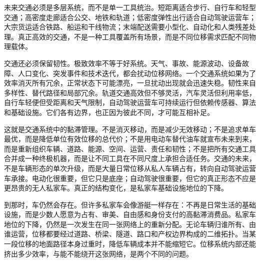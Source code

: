 
未来交通必须是多层系统，而不是单一工具统治。短距离适合步行、自行车和轻型交通；高密度走廊适合公交、地铁和轨道；低密度弹性出行适合自动驾驶运营车；大宗货运适合铁路、船运和干线物流；末端配送需要小型化、自动化和人类残差处理。真正高效的交通，不是一种工具覆盖所有场景，而是不同位移需求匹配不同物理载体。

交通还必须保留韧性。极致效率不等于好系统。天气、事故、能源波动、设备故障、人口变化、突发事件和技术迭代，都会扰动位移网络。一个交通系统如果为了效率消灭所有冗余，正常状态下可能漂亮，一旦扰动出现就会迅速失稳。韧性来自多样性、替代路径和局部冗余。轨道交通高效但不够灵活，汽车灵活但利用率低，自行车轻便但受距离和天气限制，自动驾驶运营车可持续运行但依赖传感器、算法和基础设施。它们各有边界，也正因为彼此不同，才可能互相补足。

这就是交通系统中的黏滞管理。不是消灭移动，而是减少无效移动；不是追求单车最优，而是降低单位有效位移的总代价；不是用电动车替代油车就宣布未来到来，而是重新组织车辆、道路、能源、空间、运营、责任和韧性；不是把所有交通工具合并成一种终极机器，而是让不同工具在不同尺度上承担合适任务。交通的未来，不是车辆形态的单次升级，而是大量日常位移从私人车辆占有，转向自动驾驶运营车承接。电动化很重要，但它只是底座；自动驾驶很重要，但它的真正形态不应是更昂贵的无人私家车。真正的结构变化，是私家车基础设施地位的下降。

到那时，车仍然会存在。但许多私家车会像游艇一样存在：不再是日常生活的基础设施，而是少数人愿意为占有、审美、自由感和身份支付的高黏滞消费品。私家车地位的下降，仍然是一次发生在同一张网络上的重新分配。无论车辆归谁所有、由谁运营，位移都要经过道路、桥梁、隧道、路口和产权边界构成的二维拓扑。当某一段位移的地面路径本身过重时，降低车辆成本并不能缩短它。位移系统内部还能挤出多少效率，与能不能绕开这张网络，是两个不同的问题。
